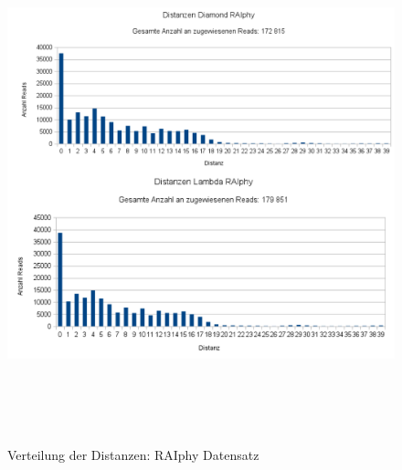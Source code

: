 \documentclass[10pt, a4paper]{article}[08.12.2015]
\begin{document}
     \begin{figure}[H]
      \centering
      \noindent\includegraphics[width=\linewidth,height=15cm,
      keepaspectratio]{Abbildungen/RAIphy_Distanzen_both.png}
      \caption{Verteilung der Distanzen: RAIphy Datensatz}
    \end{figure}
    
    \newpage
\end{document}
